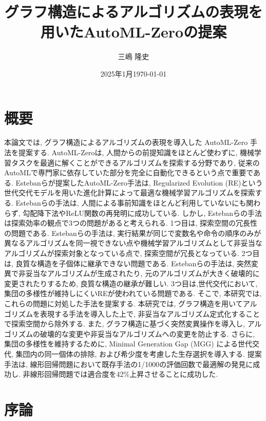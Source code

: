 \documentclass[11pt,oneside,openany,report]{jsbook}
\title{グラフ構造によるアルゴリズムの表現を用いたAutoML-Zeroの提案}
\author{三嶋 隆史}
\affiliation{東京科学大学\\情報理工学院\\情報工学系 知能情報コース}
\date{2025年1月}
\date{\today}
\begin{document}
\frontmatter

\maketitle

\chapter{概要}

本論文では, グラフ構造によるアルゴリズムの表現を導入した AutoML-Zero 手法を提案する. AutoML-Zeroは, 人間からの前提知識をほとんど使わずに, 機械学習タスクを最適に解くことができるアルゴリズムを探索する分野であり, 従来のAutoMLで専門家に依存していた部分を完全に自動化できるという点で重要である. Estebanらが提案したAutoML-Zero手法は, Regularized Evolution (RE)という世代交代モデルを用いた進化計算によって最適な機械学習アルゴリズムを探索する. Estebanらの手法は, 人間による事前知識をほとんど利用していないにも関わらず, 勾配降下法やReLU関数の再発明に成功している. しかし, Estebanらの手法は探索効率の観点で3つの問題があると考えられる. 1つ目は, 探索空間の冗長性の問題である. Estebanらの手法は, 実行結果が同じで変数名や命令の順序のみが異なるアルゴリズムを同一視できない点や機械学習アルゴリズムとして非妥当なアルゴリズムが探索対象となっている点で, 探索空間が冗長となっている. 2つ目は, 良質な構造を子個体に継承できない問題である. Estebanらの手法は, 突然変異で非妥当なアルゴリズムが生成されたり, 元のアルゴリズムが大きく破壊的に変更されたりするため, 良質な構造の継承が難しい. 3つ目は,世代交代において, 集団の多様性が維持しにくいREが使われている問題である. そこで, 本研究では, これらの問題に対処した手法を提案する. 本研究では, グラフ構造を用いてアルゴリズムを表現する手法を導入した上で, 非妥当なアルゴリズム定式化することで探索空間から除外する. また, グラフ構造に基づく突然変異操作を導入し, アルゴリズムの破壊的な変更や非妥当なアルゴリズムへの変更を防止する. さらに, 集団の多様性を維持するために, Minimal Generation Gap (MGG) による世代交代, 集団内の同一個体の排除, および希少度を考慮した生存選択を導入する. 提案手法は, 線形回帰問題において既存手法の1/1000の評価回数で最適解の発見に成功し. 非線形回帰問題では適合度を42\%上昇させることに成功した.

\tableofcontents
\listoffigures
\listoftables

\mainmatter

\chapter{序論}\label{chap:intr}
\end{document}
